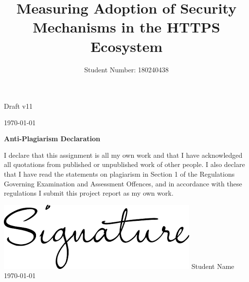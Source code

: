 \documentclass{mscreport}
\begin{document}

\vspace*{\fill}
\begin{center}
\begin{huge}
Draft v11

\vspace{3cm}
\today
\end{huge}
\end{center}
\vspace{\fill}

\newpage


\author{Student Number: 180240438	}
\title{Measuring Adoption of Security Mechanisms in the HTTPS Ecosystem}

\maketitle 


\begin{center}
    {\Large\bfseries Anti-Plagiarism Declaration}
    \vspace{1cm}
\begin{enumerate}

I declare that this assignment is all my own work and that I have acknowledged all quotations from published or unpublished work of other people.  I also declare that I have read the statements on plagiarism in Section 1 of the Regulations Governing Examination and Assessment Offences, and in accordance with these regulations I submit this project report as my own work.

\begin{flushleft}
\includegraphics[scale=0.21]{../images/signature.png} %
\newline
  \begingroup
    \noindent\textsf{Student Name} \vspace{0.5cm}\\
    \noindent\textsf{\today}
  \endgroup
  \end{flushleft}

\end{enumerate}
\end{center}
\end{document}
